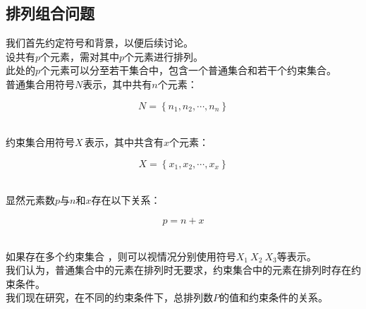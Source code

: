 \documentclass[UTF8]{ctexart}
\newcommand{\rnum}[1]{\uppercase\expandafter{\romannumeral #1\relax}}
\begin{document}
\subsection{排列组合问题\rnum{1}}
    我们首先约定符号和背景，以便后续讨论。\\[3mm]
    设共有$p$个元素，需对其中$p$个元素进行排列。\\[3mm]
    此处的$p$个元素可以分至若干集合中，包含一个普通集合和若干个约束集合。\\[3mm]
    普通集合用符号$N$表示，其中共有$n$个元素：
    \begin{large}
        \begin{equation*}
            N=\left\{n_1,n_2,\cdots,n_n\right\}
        \end{equation*}
    \end{large}\\
    约束集合用符号$X\,$表示，其中共含有$x$个元素：
    \begin{large}
        \begin{equation*}
            X=\left\{x_1,x_2,\cdots,x_x\right\}
        \end{equation*}
    \end{large}\\
    显然元素数$p$与$n$和$x$存在以下关系：
    \begin{large}
        \begin{equation*}
            p=n+x
        \end{equation*}
    \end{large}\\
    如果存在多个约束集合 ，则可以视情况分别使用符号$X_1~X_2~X_3$等表示。\\[3mm]
    我们认为，普通集合中的元素在排列时无要求，约束集合中的元素在排列时存在约束条件。\\[3mm]
    我们现在研究，在不同的约束条件下，总排列数$P$的值和约束条件的关系。
\end{document}
